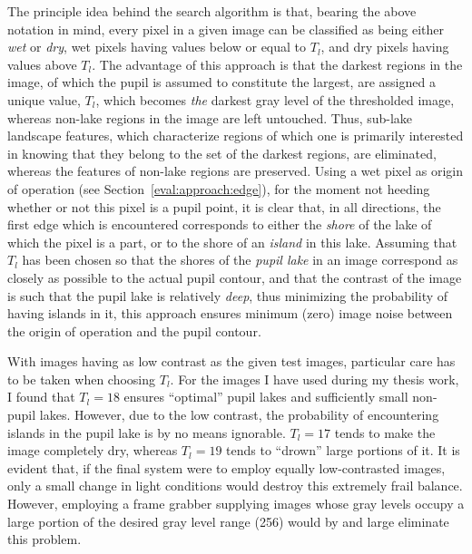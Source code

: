 The principle idea behind the search algorithm is that, bearing the
above notation in mind, every pixel in a given image can be classified
as being either {\em wet\/} or {\em dry\/}, wet pixels having values
below or equal to $T_{l}$, and dry pixels having values above $T_{l}$.
The advantage of this approach is that the darkest regions in the
image, of which the pupil is assumed to constitute the largest, are
assigned a unique value, $T_{l}$, which becomes {\em the\/} darkest
gray level of the thresholded image, whereas non-lake regions in the
image are left untouched.  Thus, sub-lake landscape features, which
characterize regions of which one is primarily interested in knowing
that they belong to the set of the darkest regions, are eliminated,
whereas the features of non-lake regions are preserved.  Using a wet
pixel as origin of operation (see Section~\ref{eval:approach:edge}),
for the moment not heeding whether or not this pixel is a pupil point,
it is clear that, in all directions, the first edge which is
encountered corresponds to either the {\em shore\/} of the lake of
which the pixel is a part, or to the shore of an {\em island\/} in
this lake.  Assuming that $T_{l}$ has been chosen so that the shores
of the {\em pupil lake\/} in an image correspond as closely as
possible to the actual pupil contour, and that the contrast of the
image is such that the pupil lake is relatively {\em deep\/}, thus
minimizing the probability of having islands in it, this approach
ensures minimum (zero) image noise between the origin of operation and
the pupil contour.

With images having as low contrast as the given test images,
particular care has to be taken when choosing $T_{l}$.  For the images
I have used during my thesis work, I found that $T_{l}=18$ ensures
``optimal'' pupil lakes and sufficiently small non-pupil lakes.
However, due to the low contrast, the probability of encountering
islands in the pupil lake is by no means ignorable.  $T_{l}=17$ tends
to make the image completely dry, whereas $T_{l}=19$ tends to
``drown'' large portions of it.  It is evident that, if the final
system were to employ equally low-contrasted images, only a small
change in light conditions would destroy this extremely frail balance.
However, employing a frame grabber supplying images whose gray levels
occupy a large portion of the desired gray level range (256) would by
and large eliminate this problem.


